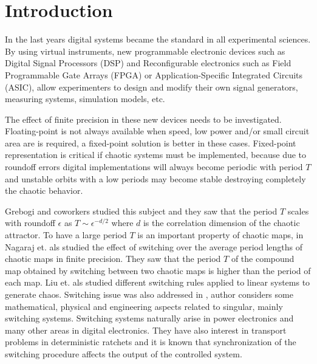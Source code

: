 \section{Introduction} \label{sec:intro}

In the last years digital systems became the standard in all experimental sciences.
By using virtual instruments, new programmable electronic devices such as Digital Signal Processors (DSP) and Reconfigurable electronics such as Field Programmable Gate Arrays (FPGA) or Application-Specific Integrated Circuits (ASIC), allow experimenters to design and modify their own signal generators, measuring systems, simulation models, etc.

The effect of finite precision in these new devices needs to be investigated.
Floating-point is not always available when speed, low power and/or small circuit area are is required, a fixed-point solution is better in these cases.
Fixed-point representation is critical if chaotic systems must be implemented, because due to roundoff errors digital implementations will always become periodic with period $T$ and unstable orbits with a low periods may become stable destroying completely the chaotic behavior.

Grebogi and coworkers \cite{Grebogi1988} studied this subject and they saw that the period $T$ scales with roundoff $\epsilon$ as $T\sim\epsilon^{-d/2}$ where $d$ is the correlation dimension of the chaotic attractor.
To have a large period $T$ is an important property of chaotic maps, in \cite{Nagaraj2008} Nagaraj et. als studied the effect of switching over the average period lengths of chaotic maps in finite precision.
They saw that the period $T$ of the compound map obtained by switching between two chaotic maps is higher than the period of each map.
Liu et. als \cite{Liu2006} studied different switching rules applied to linear systems to generate chaos.
Switching issue was also addressed in \cite{Gluskin2008}, author considers some mathematical, physical and engineering aspects related to singular, mainly switching systems.
Switching systems naturally arise in power electronics and many other areas in digital electronics.
They have also interest in transport problems in deterministic ratchets \cite{Zarlenga2009} and it is known that synchronization of the switching procedure affects the output of the controlled system.


